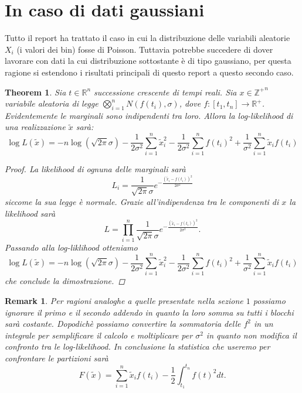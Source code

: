 \documentclass[10pt,a4paper]{report}
\newtheorem{theorem}{Theorem}
\newtheorem{remark}{Remark}
\begin{document}
\section{In caso di dati gaussiani}
Tutto il report ha trattato il caso in cui la distribuzione delle variabili aleatorie $X_i$ (i valori dei bin) fosse di Poisson. Tuttavia potrebbe succedere di dover lavorare con dati la cui distribuzione sottostante è di tipo gaussiano, per questa ragione si estendono i risultati principali di questo report a questo secondo caso.
\begin{theorem}
Sia $t\in\mathbb{R}^n$ successione crescente di tempi reali.
Sia $x\in\mathbb{Z^+}^n$ variabile aleatoria di legge $\bigotimes_{i=1}^{n}N(f(t_i),\sigma)$, dove $f:[t_1,t_n]\rightarrow\mathbb{R}^+$. Evidentemente le marginali sono indipendenti tra loro. Allora la log-likelihood di una realizzazione $\tilde{x}$ sarà:
$$
\log L(\tilde{x}) = -n\log(\sqrt{2\pi}\sigma)-\frac{1}{2\sigma^2}\sum_{i=1}^n\tilde{x}_i^2  -\frac{1}{2\sigma^2}\sum_{i=1}^n f(t_i)^2+\frac{1}{\sigma^2}\sum_{i=1}^n\tilde{x}_if(t_i)
$$
\begin{proof}
La likelihood di ognuna delle marginali sarà 
$$
L_i = \frac{1}{\sqrt{2\pi}\sigma}e^{-\frac{(\tilde{x}_i-f(t_i))^2}{2\sigma^2}}
$$
siccome la sua legge è normale. Grazie all'indipendenza tra le componenti di $x$ la likelihood sarà
$$
L = \prod_{i=1}^{n}\frac{1}{\sqrt{2\pi}\sigma}e^{-\frac{(\tilde{x}_i-f(t_i))^2}{2\sigma^2}}.
$$
Passando alla log-liklihood otteniamo
$$
\log L(\tilde{x}) = -n\log(\sqrt{2\pi}\sigma)-\frac{1}{2\sigma^2}\sum_{i=1}^n\tilde{x}_i^2  -\frac{1}{2\sigma^2}\sum_{i=1}^n f(t_i)^2+\frac{1}{\sigma^2}\sum_{i=1}^n\tilde{x}_if(t_i)
$$
che conclude la dimostrazione.
\end{proof}
\end{theorem}
\begin{remark}
Per ragioni analoghe a quelle presentate nella sezione $1$ possiamo ignorare il primo e il secondo addendo in quanto la loro somma su tutti i blocchi sarà costante. Dopodichè possiamo convertire la sommatoria delle $f^2$ in un integrale per semplificare il calcolo e moltiplicare per $\sigma^2$ in quanto non modifica il confronto tra le log-likelihood. In conclusione la statistica che useremo per confrontare le partizioni sarà
\begin{equation}\label{Cash_gaussian}
F(\tilde{x}) = \sum_{i=1}^n\tilde{x}_if(t_i)-\frac{1}{2}\int_{t_1}^{t_n}f(t)^2dt.
\end{equation}
\end{remark}
\end{document}
